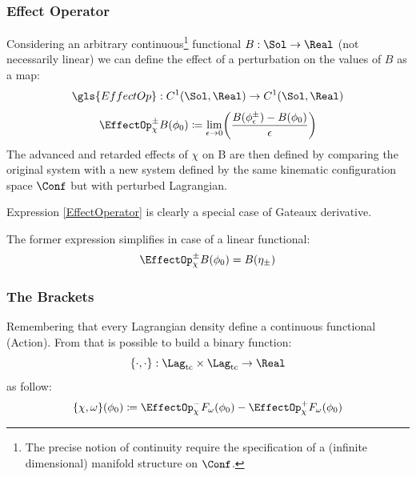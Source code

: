 \documentclass[Main]{subfiles}
\begin{document}
			
   		
		\subsubsection{Effect Operator}
		Considering an arbitrary continuous\footnote{The precise notion of continuity require the specification of a (infinite dimensional) manifold structure on $\Conf$.} functional $B: \Sol \rightarrow \Real$ (not necessarily linear) we can define the effect of a perturbation on the values of $B$\cite[pag. 5]{Marolf1993} as a map:
		\begin{displaymath}
			\gls{EffectOp} : C^1(\Sol,\Real) \rightarrow C^1(\Sol,\Real)
		\end{displaymath}
		\begin{equation}\label{EffectOperator}
		\EffectOp_\chi^\pm B ( \phi_0) 
		\coloneqq \lim_{\epsilon \rightarrow 0}
		 \biggr( \frac{B(\phi_\epsilon^\pm) - B (\phi_0)}{\epsilon} \biggr)
		\end{equation}
		The advanced and retarded effects of $\chi$ on B are then defined by comparing the original system with a new system defined by the same kinematic configuration space $\Conf$ but with perturbed Lagrangian.
		\begin{observation}
			Expression \ref{EffectOperator} is clearly a special case of Gateaux derivative.\cite{Blanchard2015}
		\end{observation}
		
		
		The former expression simplifies in case of a linear functional:
			\begin{equation}\label{EffectOperatorLinear}
				\EffectOp_\chi^\pm B ( \phi_0) =  B(\eta_\pm)
			\end{equation}
		
		\subsubsection{The Brackets}
		Remembering that every Lagrangian density define a continuous functional (Action).
		From that is possible to build a binary function:
		\begin{displaymath}
			\{\cdot,\cdot\}:\Lag_{\textrm{tc}} \times \Lag_{\textrm{tc}} \rightarrow \Real 	
		\end{displaymath}
		as follow:
		\begin{equation}\label{AbstractPeierlsBracket}
				\{\chi, \omega \}(\phi_0) \coloneqq \EffectOp_\chi^- F_\omega (\phi_0) - \EffectOp_\chi^+ F_\omega(\phi_0)
		\end{equation}
\end{document}
